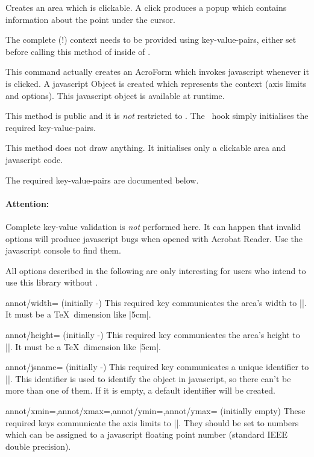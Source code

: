 \begin{command}{\pgfplotsclickablecreate{}}
	Creates an area which is clickable. A click produces a popup which
	contains information about the point under the cursor.
	
	The complete (!) context needs to be provided using key-value-pairs, either set before
	calling this method of inside of .
	
	This command actually creates an AcroForm which invokes javascript
	whenever it is clicked. A javascript Object is created which
	represents the context (axis limits and options). This javascript
	object is available at runtime.
	
	This method is public and it is \emph{not} restricted to \PGFPlots.
	The \PGFPlots\ hook simply initialises the required key-value-pairs.

	This method does not draw anything. It initialises only a
	clickable area and javascript code.
	
	The required key-value-pairs are documented below.
	
	\paragraph{Attention:} Complete key-value validation is \emph{not} performed here. It
	can happen that invalid options will produce javascript bugs when
	opened with Acrobat Reader. Use the javascript console to find them.
\end{command}

\noindent All options described in the following are only interesting for users who intend to use this library without \PGFPlots.

\begin{pgfplotskey}{annot/width= (initially -)}
	This required key communicates the area's width to |\pgfplotsclickablecreate|. It must be a \TeX\ dimension like |5cm|.
\end{pgfplotskey}
\begin{pgfplotskey}{annot/height= (initially -)}
	This required key communicates the area's height to |\pgfplotsclickablecreate|. It must be a \TeX\ dimension like |5cm|.
\end{pgfplotskey}
\begin{pgfplotskey}{annot/jsname= (initially -)}
	This required key communicates a unique identifier to |\pgfplotsclickablecreate|. This identifier is used to identify the object in javascript, so there can't be more than one of them. If it is empty, a default identifier will be created.
\end{pgfplotskey}

\begin{pgfplotskeylist}{annot/xmin=,annot/xmax=,annot/ymin=,annot/ymax= (initially empty)}
	These required keys communicate the axis limits to |\pgfplotsclickablecreate|. They should be set to numbers which can be assigned to a javascript floating point number (standard IEEE double precision).
\end{pgfplotskeylist}



